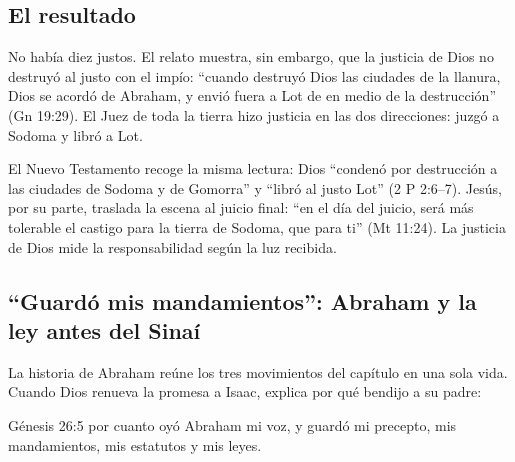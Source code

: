\subsection{El resultado}
No había diez justos. El relato muestra, sin embargo, que la justicia de Dios no destruyó al justo con el impío: ``cuando destruyó Dios las ciudades de la llanura, Dios se acordó de Abraham, y envió fuera a Lot de en medio de la destrucción'' (Gn 19:29). El Juez de toda la tierra hizo justicia en las dos direcciones: juzgó a Sodoma y libró a Lot.

El Nuevo Testamento recoge la misma lectura: Dios ``condenó por destrucción a las ciudades de Sodoma y de Gomorra'' y ``libró al justo Lot'' (2 P 2:6--7). Jesús, por su parte, traslada la escena al juicio final: ``en el día del juicio, será más tolerable el castigo para la tierra de Sodoma, que para ti'' (Mt 11:24). La justicia de Dios mide la responsabilidad según la luz recibida.


\subsection{“Guardó mis mandamientos”: Abraham y la ley antes del Sinaí}
La historia de Abraham reúne los tres movimientos del capítulo en una sola vida. Cuando Dios renueva la promesa a Isaac, explica por qué bendijo a su padre:

\begin{verso}{Génesis 26:5}
por cuanto oyó Abraham mi voz, y guardó mi precepto, mis mandamientos, mis estatutos y mis leyes.
\end{verso}

